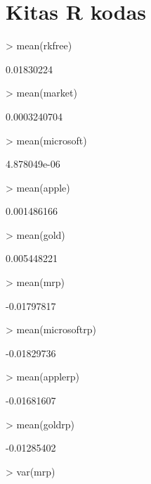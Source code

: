 \documentclass[12pt, a14paper, lithuanian]{article}
\begin{document}
\section{Kitas R kodas}
\begin{Schunk}
\begin{Sinput}
> mean(rkfree)
\end{Sinput}
\begin{Soutput}
[1] 0.01830224
\end{Soutput}
\begin{Sinput}
> mean(market)
\end{Sinput}
\begin{Soutput}
[1] 0.0003240704
\end{Soutput}
\begin{Sinput}
> mean(microsoft)
\end{Sinput}
\begin{Soutput}
[1] 4.878049e-06
\end{Soutput}
\begin{Sinput}
> mean(apple)
\end{Sinput}
\begin{Soutput}
[1] 0.001486166
\end{Soutput}
\begin{Sinput}
> mean(gold)
\end{Sinput}
\begin{Soutput}
[1] 0.005448221
\end{Soutput}
\begin{Sinput}
> mean(mrp)
\end{Sinput}
\begin{Soutput}
[1] -0.01797817
\end{Soutput}
\begin{Sinput}
> mean(microsoftrp)
\end{Sinput}
\begin{Soutput}
[1] -0.01829736
\end{Soutput}
\begin{Sinput}
> mean(applerp)
\end{Sinput}
\begin{Soutput}
[1] -0.01681607
\end{Soutput}
\begin{Sinput}
> mean(goldrp)
\end{Sinput}
\begin{Soutput}
[1] -0.01285402
\end{Soutput}
\begin{Sinput}
> var(mrp)
\end{Sinput}

\end{Schunk}
\end{document}

